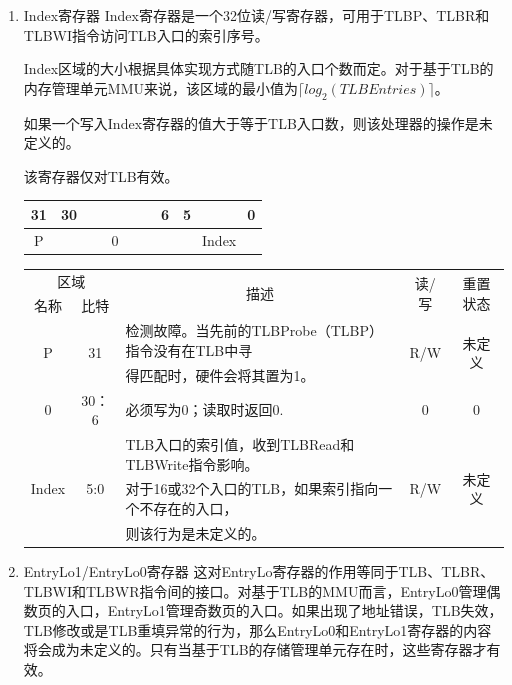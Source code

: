 \begin{enumerate}[(1)]
\item Index寄存器
Index寄存器是一个32位读/写寄存器，可用于TLBP、TLBR和TLBWI指令访问TLB入口的索引序号。

Index区域的大小根据具体实现方式随TLB的入口个数而定。对于基于TLB的内存管理单元MMU来说，该区域的最小值为$\lceil log_{2}(TLBEntries)\rceil$。

如果一个写入Index寄存器的值大于等于TLB入口数，则该处理器的操作是未定义的。

该寄存器仅对TLB有效。

\begin{table}[H]
\centering
\begin{tabular}{ccccccccccccc}
31&30&&&&&&6&5&&&&0\\
\hline
\multicolumn{1}{|c|}{P}&
\multicolumn{7}{c|}{0}&
\multicolumn{5}{c|}{Index}\\
\hline
\end{tabular}
\end{table}

\begin{table}[H]
\centering
\begin{tabular}{|c|c|c|c|c|}
\hline
\multicolumn{2}{|c|}{区域}&
\multirow{2}{*}{描述}&
\multirow{2}{*}{读/写}&
\multirow{2}{*}{重置状态}\\
\cline{1-2}
名称&比特&&&\\
\hline
\multirow{2}{*}{P}&
\multirow{2}{*}{31}&
\multicolumn{1}{l|}{检测故障。当先前的TLBProbe（TLBP）指令没有在TLB中寻}&
\multirow{2}{*}{R/W}&
\multirow{2}{*}{未定义}\\
&&
\multicolumn{1}{l|}{得匹配时，硬件会将其置为1。}&
&\\
\hline
0&30：6&
\multicolumn{1}{l|}{必须写为0；读取时返回0.}&
0&0\\
\hline
\multirow{3}{*}{Index}&
\multirow{3}{*}{5:0}&
\multicolumn{1}{l|}{TLB入口的索引值，收到TLBRead和TLBWrite指令影响。}&
\multirow{3}{*}{R/W}&
\multirow{3}{*}{未定义}\\
&&
\multicolumn{1}{l|}{对于16或32个入口的TLB，如果索引指向一个不存在的入口，}&
&\\
&&
\multicolumn{1}{l|}{则该行为是未定义的。}&
&\\
\hline
\end{tabular}
\end{table}

\item EntryLo1/EntryLo0寄存器
这对EntryLo寄存器的作用等同于TLB、TLBR、TLBWI和TLBWR指令间的接口。对基于TLB的MMU而言，EntryLo0管理偶数页的入口，EntryLo1管理奇数页的入口。如果出现了地址错误，TLB失效，TLB修改或是TLB重填异常的行为，那么EntryLo0和EntryLo1寄存器的内容将会成为未定义的。只有当基于TLB的存储管理单元存在时，这些寄存器才有效。


\end{enumerate}
